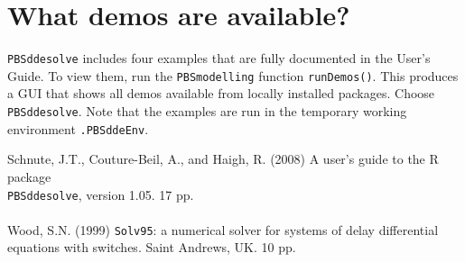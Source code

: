 \documentclass[letter,11pt]{article}
\newcommand{\pbsd}{\texttt{PBSddesolve}}
\newcommand{\pbsm}{\texttt{PBSmodelling}}
\newcommand{\code}[1]{\texttt{#1}}
\begin{document}
\section{What demos are available?}

\pbsd{} includes four examples that are fully documented in the User's Guide. To view them, run the \pbsm{} function \code{runDemos()}.
This produces a GUI that shows all demos available from locally installed packages.
Choose \pbsd{}. 
Note that the examples are run in the temporary working environment \code{.PBSddeEnv}.

\vspace*{4ex} 

\vspace*{2ex} \noindent Schnute, J.T., Couture-Beil, A., and Haigh, R. (2008) A user's guide to the R package\\ \pbsd{}, version 1.05. 17 pp.\\\\
Wood, S.N. (1999) \code{Solv95}: a numerical solver for systems of delay differential equations with switches. Saint Andrews, UK. 10 pp.
\end{document}
